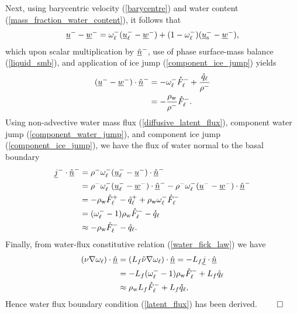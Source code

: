 Next, using barycentric velocity (\ref{barycentre}) and water content (\ref{mass_fraction_water_content}), it follows that
\begin{align*}
  \underline{u}^- - \underline{w}^- = \omega_{\mathrm{\ell}}^- (\underline{u}_{\mathrm{\ell}}^- - \underline{w}^-) + (1-\omega_{\mathrm{\ell}}^-) (\underline{u}_{\mathrm{s}}^- - \underline{w}^-),
\end{align*}
which upon scalar multiplication by $\underline{\hat{n}}^-$, use of phase surface-mass balance (\ref{liquid_smb}), and application of ice jump (\ref{component_ice_jump}) yields
\begin{align*}
  (\underline{u}^- - \underline{w}^-) \cdot \underline{\hat{n}}^- &= - \omega_{\mathrm{\ell}}^- \mathring{F}_{\mathrm{\ell}}^- + \frac{\mathring{q}_{\mathrm{\ell}}}{\rho^-} \\
  &= - \frac{\rho_{\mathrm{w}}}{\rho^-} \mathring{F}_{\mathrm{\ell}}^-. 
\end{align*}
Using non-advective water mass flux (\ref{diffusive_latent_flux}), component water jump (\ref{component_water_jump}), and component ice jump (\ref{component_ice_jump}), we have the flux of water normal to the basal boundary
\begin{align*}
  \underline{j}^- \cdot \underline{\hat{n}}^- &= \rho^- \omega_{\mathrm{\ell}}^- (\underline{u}_{\mathrm{\ell}}^- - \underline{u}^-) \cdot \underline{\hat{n}}^- \notag \\
  &= \rho^- \omega_{\mathrm{\ell}}^- (\underline{u}_{\mathrm{\ell}}^- - \underline{w}^-) \cdot \underline{\hat{n}}^- - \rho^- \omega_{\mathrm{\ell}}^- (\underline{u}^- - \underline{w}^-) \cdot \underline{\hat{n}}^- \notag \\
  &= - \rho_{\mathrm{w}} \mathring{F}_{\mathrm{\ell}}^+ - \mathring{q}_{\mathrm{\ell}}^+ + \rho_{\mathrm{w}} \omega_{\mathrm{\ell}}^- \mathring{F}_{\mathrm{\ell}}^- \notag \\
  &= (\omega_{\mathrm{\ell}}^- - 1) \rho_{\mathrm{w}} \mathring{F}_{\mathrm{\ell}}^- - \mathring{q}_{\mathrm{\ell}} \notag \\
  &\approx - \rho_{\mathrm{w}} \mathring{F}_{\mathrm{\ell}}^- - \mathring{q}_{\mathrm{\ell}}.
\end{align*}
Finally, from water-flux constitutive relation (\ref{water_fick_law}) we have 
\begin{align*}
  \left( \nu \nabla \omega_{\mathrm{\ell}} \right) \cdot \underline{\hat{n}} &= \left( L_f \tilde{\nu} \nabla \omega_{\mathrm{\ell}} \right) \cdot \underline{\hat{n}} = - L_f \underline{j} \cdot \underline{\hat{n}}  \notag \\
  &= - L_f (\omega_{\mathrm{\ell}}^- - 1) \rho_{\mathrm{w}} \mathring{F}_{\mathrm{\ell}}^- + L_f \mathring{q}_{\mathrm{\ell}} \notag \\
  &\approx \rho_{\mathrm{w}} L_f \mathring{F}_{\mathrm{\ell}}^- + L_f \mathring{q}_{\mathrm{\ell}},
\end{align*}
Hence water flux boundary condition (\ref{latent_flux}) has been derived. $\qed$

